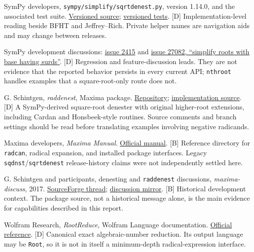 \documentclass[11pt,a4paper]{article}
\numberwithin{equation}{section}
\theoremstyle{definition}\newtheorem{definition}[theorem]{Definition}
\theoremstyle{remark}\newtheorem{remark}[theorem]{Remark}
\newcommand{\access}[2]{\href{#1}{#2}}
\newcommand{\status}[1]{\textsf{\footnotesize[#1]}}
\begin{document}
\begin{thebibliography}{99}
 SymPy developers, \texttt{sympy/simplify/sqrtdenest.py}, version 1.14.0, and the associated test suite.
\access{https://github.com/sympy/sympy/blob/1.14.0/sympy/simplify/sqrtdenest.py}{Versioned source};
\access{https://github.com/sympy/sympy/blob/1.14.0/sympy/simplify/tests/test_sqrtdenest.py}{versioned tests}. \status{D}
Implementation-level reading beside BFHT and Jeffrey--Rich. Private helper names are navigation aids and may change between releases.

 SymPy development discussions:
\access{https://github.com/sympy/sympy/issues/2415}{issue 2415} and
\access{https://github.com/sympy/sympy/issues/27082}{issue 27082, ``simplify roots with base having surds''}. \status{D}
Regression and feature-discussion leads. They are not evidence that the reported behavior persists in every current API; \texttt{nthroot} handles examples that a square-root-only route does not.

 G. Schintgen, \emph{raddenest}, Maxima package.
\access{https://github.com/gschintgen/raddenest}{Repository};
\access{https://raw.githubusercontent.com/gschintgen/raddenest/master/raddenest.mac}{implementation source}. \status{D}
A SymPy-derived square-root denester with original higher-root extensions, including Cardan and Honsbeek-style routines. Source comments and branch settings should be read before translating examples involving negative radicands.

 Maxima developers, \emph{Maxima Manual}.
\access{https://maxima.sourceforge.io/docs/manual/maxima_singlepage.html}{Official manual}. \status{B}
Reference directory for \texttt{radcan}, radical expansion, and installed package interfaces. Legacy \texttt{sqdnst}/\texttt{sqrtdenest} release-history claims were not independently settled here.

 G. Schintgen and participants, denesting and \texttt{raddenest} discussions, \emph{maxima-discuss}, 2017.
\access{https://sourceforge.net/p/maxima/mailman/maxima-discuss/thread/o6lan6\%24h4r\%241\%40blaine.gmane.org/}{SourceForge thread};
\access{https://maxima-discuss.narkive.com/rz7bUs4t/denesting}{discussion mirror}. \status{B}
Historical development context. The package source, not a historical message alone, is the main evidence for capabilities described in this report.

 Wolfram Research, \emph{RootReduce}, Wolfram Language documentation.
\access{https://reference.wolfram.com/language/ref/RootReduce.html}{Official reference}. \status{D}
Canonical exact algebraic-number reduction. Its output language may be \texttt{Root}, so it is not in itself a minimum-depth radical-expression interface.


\end{thebibliography}
\end{document}
